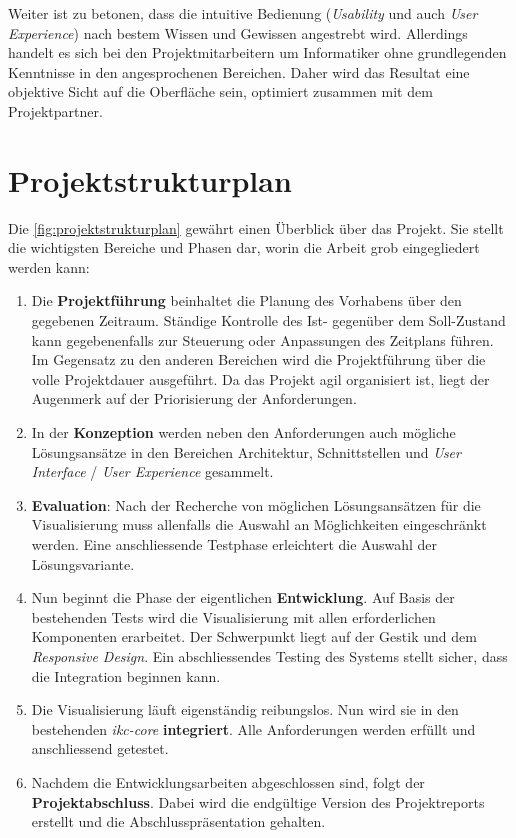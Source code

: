 Weiter ist zu betonen, dass die intuitive Bedienung (\textit{Usability} und auch \textit{User Experience}) nach bestem Wissen und Gewissen angestrebt wird. Allerdings handelt es sich bei den Projektmitarbeitern um Informatiker ohne grundlegenden Kenntnisse in den angesprochenen Bereichen. Daher wird das Resultat eine objektive Sicht auf die Oberfläche sein, optimiert zusammen mit dem Projektpartner.

\section{Projektstrukturplan}
Die \autoref{fig:projektstrukturplan} gewährt einen Überblick über das Projekt. Sie stellt die wichtigsten Bereiche und Phasen dar, worin die Arbeit grob eingegliedert werden kann:
\begin{enumerate}
    \item Die \textbf{Projektführung} beinhaltet die Planung des Vorhabens über den gegebenen Zeitraum. Ständige Kontrolle des Ist- gegenüber dem Soll-Zustand kann gegebenenfalls zur Steuerung oder Anpassungen des Zeitplans führen. Im Gegensatz zu den anderen Bereichen wird die Projektführung über die volle Projektdauer ausgeführt. Da das Projekt agil organisiert ist, liegt der Augenmerk auf der Priorisierung der Anforderungen.
    \item In der \textbf{Konzeption} werden neben den Anforderungen auch mög\-li\-che Lösungsansätze in den Bereichen Architektur, Schnittstellen und \textit{User Interface} / \textit{User Experience} gesammelt.
    \item \textbf{Evaluation}: Nach der Recherche von möglichen Lö\-sungs\-an\-sätz\-en für die Visualisierung muss allenfalls die Auswahl an Mög\-li\-chkei\-ten eingeschränkt werden. Eine anschliessende Testphase erleichtert die Auswahl der Lösungsvariante.
    \item Nun beginnt die Phase der eigentlichen \textbf{Entwicklung}. Auf Basis der bestehenden Tests wird die Visualisierung mit allen erforderlichen Komponenten erarbeitet. Der Schwerpunkt liegt auf der Gestik und dem \textit{Responsive Design}. Ein abschliessendes Testing des Systems stellt sicher, dass die Integration beginnen kann.
    \item Die Visualisierung läuft eigenständig reibungslos. Nun wird sie in den bestehenden \textit{ikc-core} \textbf{integriert}. Alle Anforderungen werden erfüllt und anschliessend getestet.
    \item Nachdem die Entwicklungsarbeiten abgeschlossen sind, folgt der \textbf{Projektabschluss}. Dabei wird die endgültige Version des Projektreports erstellt und die Abschlusspräsentation gehalten.
\end{enumerate}

